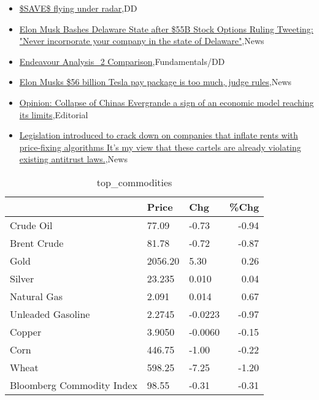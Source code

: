 \documentclass{article}%
\begin{document}
%
\begin{itemize}%
\item%
\href{https://reddit.com/r/wallstreetbets/comments/1afgocl/save\_flying\_under\_radar/}{\$SAVE\$ flying under radar},DD%
\item%
\href{https://reddit.com/r/StockMarket/comments/1af96j4/elon\_musk\_bashes\_delaware\_state\_after\_55b\_stock/}{Elon Musk Bashes Delaware State after \$55B Stock Options Ruling Tweeting: "Never incorporate your company in the state of Delaware"},News%
\item%
\href{https://reddit.com/r/StockMarket/comments/1af2f7e/endeavour\_analysis\_2\_comparison/}{Endeavour Analysis\_2 Comparison},Fundamentals/DD%
\item%
\href{https://reddit.com/r/Economics/comments/1afcu13/elon\_musks\_56\_billion\_tesla\_pay\_package\_is\_too/}{Elon Musks \$56 billion Tesla pay package is too much, judge rules},News%
\item%
\href{https://reddit.com/r/Economics/comments/1afags5/opinion\_collapse\_of\_chinas\_evergrande\_a\_sign\_of/}{Opinion: Collapse of Chinas Evergrande a sign of an economic model reaching its limits},Editorial%
\item%
\href{https://reddit.com/r/Economics/comments/1af43na/legislation\_introduced\_to\_crack\_down\_on\_companies/}{Legislation introduced to crack down on companies that inflate rents with price-fixing algorithms  It's my view that these cartels are already violating existing antitrust laws.},News%
\end{itemize}%


\begin{table}[htbp]%
\caption{top\_commodities}%
\centering%
\begin{adjustbox}{width=1\textwidth}%
\begin{tabular}{lllr}
\toprule
                          &   Price &     Chg &  \%Chg \\
\midrule
               Crude Oil  &   77.09 &   -0.73 & -0.94 \\
             Brent Crude  &   81.78 &   -0.72 & -0.87 \\
                    Gold  & 2056.20 &    5.30 &  0.26 \\
                  Silver  &  23.235 &   0.010 &  0.04 \\
             Natural Gas  &   2.091 &   0.014 &  0.67 \\
       Unleaded Gasoline  &  2.2745 & -0.0223 & -0.97 \\
                  Copper  &  3.9050 & -0.0060 & -0.15 \\
                    Corn  &  446.75 &   -1.00 & -0.22 \\
                   Wheat  &  598.25 &   -7.25 & -1.20 \\
Bloomberg Commodity Index &   98.55 &   -0.31 & -0.31 \\
\bottomrule
\end{tabular}
%
\end{adjustbox}%
\end{table}
\end{document}
